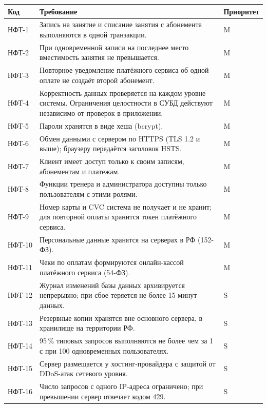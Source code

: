 \documentclass[14pt,a4paper]{extarticle}
\begin{document}
\begingroup\small
\begin{xltabular}{\textwidth}{|p{1.6cm}|L|>{\centering\arraybackslash}p{2.1cm}|}
  \hline
  \textbf{Код} & \textbf{Требование} & \textbf{Приоритет} \\ \hline
  \endhead
  НФТ-1 & Запись на занятие и списание занятия с абонемента выполняются в одной транзакции. & M \\ \hline
  НФТ-2 & При одновременной записи на последнее место вместимость занятия не превышается. & M \\ \hline
  НФТ-3 & Повторное уведомление платёжного сервиса об одной оплате не создаёт второй абонемент. & M \\ \hline
  НФТ-4 & Корректность данных проверяется на каждом уровне системы. Ограничения целостности в СУБД действуют независимо от проверок в приложении. & M \\ \hline
  НФТ-5 & Пароли хранятся в виде хеша (bcrypt). & M \\ \hline
  НФТ-6 & Обмен данными с сервером по HTTPS (TLS 1.2 и выше); браузеру передаётся заголовок HSTS. & M \\ \hline
  НФТ-7 & Клиент имеет доступ только к своим записям, абонементам и платежам. & M \\ \hline
  НФТ-8 & Функции тренера и администратора доступны только пользователям с этими ролями. & M \\ \hline
  НФТ-9 & Номер карты и CVC система не получает и не хранит; для повторной оплаты хранится токен платёжного сервиса. & M \\ \hline
  НФТ-10 & Персональные данные хранятся на серверах в РФ (152-ФЗ). & M \\ \hline
  НФТ-11 & Чеки по оплатам формируются онлайн-кассой платёжного сервиса (54-ФЗ). & M \\ \hline
  НФТ-12 & Журнал изменений базы данных архивируется непрерывно; при сбое теряется не более 15 минут данных. & S \\ \hline
  НФТ-13 & Резервные копии хранятся вне основного сервера, в хранилище на территории РФ. & S \\ \hline
  НФТ-14 & 95\,\% типовых запросов выполняются не более чем за 1 с при 100 одновременных пользователях. & S \\ \hline
  НФТ-15 & Сервер размещается у хостинг-провайдера с защитой от DDoS-атак сетевого уровня. & S \\ \hline
  НФТ-16 & Число запросов с одного IP-адреса ограничено; при превышении сервер отвечает кодом 429. & S \\ \hline

\end{xltabular}
\end{document}
